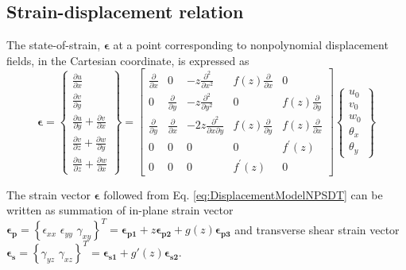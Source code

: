 \documentclass[3p,preprint,12pt]{elsarticle}
\begin{document}
\subsection{\label{sub:Strain-Displacement-Relation}Strain-displacement relation}
The state-of-strain, $ \boldsymbol{\epsilon} $ at a point corresponding to nonpolynomial displacement fields, in the Cartesian coordinate, is expressed as 
\begin{equation}
\boldsymbol{\epsilon} =\left\{ \begin{array}{c}
\frac{\partial u}{\partial x}\\
\frac{\partial v}{\partial y}\\
\frac{\partial u}{\partial y}+\frac{\partial v}{\partial x}\\
\frac{\partial v}{\partial z}+\frac{\partial w}{\partial y}\\
\frac{\partial u}{\partial z}+\frac{\partial w}{\partial x}
\end{array}\right\} =\left[\begin{array}{ccccc}
\frac{\partial}{\partial x} & 0 & -z\frac{\partial^{2}}{\partial x^{2}} & f\left(z\right)\frac{\partial}{\partial x} & 0\\
0 & \frac{\partial}{\partial y} & -z\frac{\partial^{2}}{\partial y^{2}} & 0 & f\left(z\right)\frac{\partial}{\partial y}\\
\frac{\partial}{\partial y} & \frac{\partial}{\partial x} & -2z\frac{\partial^{2}}{\partial x\partial y} & f\left(z\right)\frac{\partial}{\partial y} & f\left(z\right)\frac{\partial}{\partial x}\\
0 & 0 & 0 & 0 & f^\prime(z)\\
0 & 0 & 0 & f^\prime(z) & 0
\end{array}\right]\left\{ \begin{array}{c}
u_{0}\\
v_{0}\\
w_{0}\\
\theta_{x}\\
\theta_{y}
\end{array}\right\} \label{eq:StrainDisplacementRelation}
\end{equation}

The strain vector $ \boldsymbol{\epsilon} $  followed from Eq. \cref{eq:DisplacementModelNPSDT} can be written as summation of in-plane strain vector $\boldsymbol{\epsilon_{p}}=\left\{\epsilon_{xx}\,\,\epsilon_{yy}\,\,\gamma_{xy}\right\}^{T} = \boldsymbol{\epsilon_{p1}} + z \boldsymbol{\epsilon_{p2}} + g(z) \boldsymbol{\epsilon_{p3}}$ and transverse shear strain vector $\boldsymbol{\epsilon_{s}}=\left\{ \gamma_{yz} \,\, \gamma_{xz} \right\}^{T} = \boldsymbol{\epsilon_{s1}} +g'\left(z\right)\boldsymbol{\epsilon_{s2}}$. 
\end{document}
